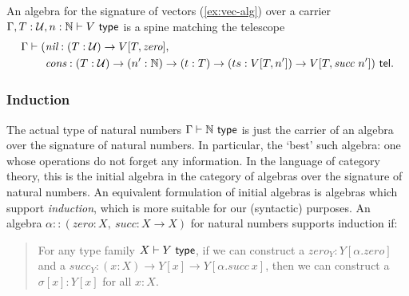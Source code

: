 \begin{example}[Vectors]\label{ex:vec-alg}
An algebra for the signature of vectors (\cref{ex:vec-alg}) over a carrier $\Gamma, T : \mathcal{U}, n : \mathbb{N} \vdash V \ \textsf{type}$ is a spine matching
the telescope
\begin{align*}
 \Gamma \vdash (&\textit{nil} : (T : \mathcal{U}) \to V[T, \textit{zero}], \\
&\textit{cons} : (T : \mathcal{U}) \to (n' : \mathbb{N}) \to (t : T) \to (ts : V[T,n']) \to V[T, \textit{succ}\ n']) \ \textsf{tel}.
\end{align*}
\end{example}

\subsubsection{Induction} The actual type of natural numbers $\Gamma \vdash \mathbb{N} \ \textsf{type}$
is just the carrier of an algebra over the signature of natural numbers. In particular,
the `best' such algebra: one whose operations do not forget any information.
In the language of category theory, this is the initial algebra in the
category of algebras over the signature of natural numbers. An equivalent
formulation of initial algebras is algebras which support \emph{induction}, which is
more suitable for our (syntactic) purposes.
An algebra $\alpha :: (\textit{zero}: X,\ \textit{succ}: X \to X)$ for natural numbers supports induction if:

\begin{quote}
For any type family $X \vdash Y \ \textsf{type}$,
if we can construct a $\textit{zero}_Y : Y[\alpha.\textit{zero}]$ and a $\textit{succ}_Y : (x : X) \to Y[x] \to Y[\alpha.\textit{succ}\ x]$,
then we can construct a $\sigma[x] : Y[x]$ for all $x : X$.
\end{quote}

